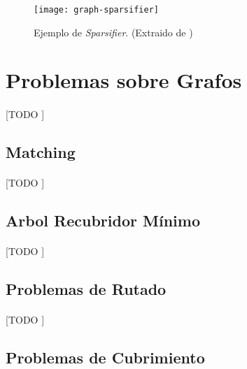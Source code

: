 \documentclass{subfiles}
\begin{document}
        \begin{figure}
          \centering
          \texttt{[image: graph-sparsifier]}
          \caption{Ejemplo de \emph{Sparsifier}. (Extraido de \cite{harvey2011randomized})}
          \label{img:graph_community_structure}
        \end{figure}

    \section{Problemas sobre Grafos}
    \label{sec:graph_problems}

      \paragraph{}
      [TODO ]

      \subsection{Matching}
      \label{sec:graph_matchings}

        \paragraph{}
        [TODO ]

      \subsection{Arbol Recubridor Mínimo}
      \label{sec:minimum_spanning_tree}

        \paragraph{}
        [TODO ]

      \subsection{Problemas de Rutado}
      \label{sec:network_routing}

        \paragraph{}
        [TODO ]

      \subsection{Problemas de Cubrimiento}
      \label{sec:network_covering}
\end{document}
